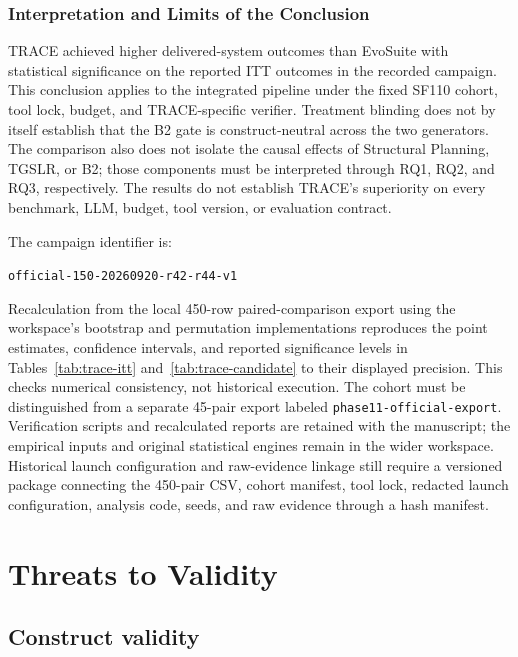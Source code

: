 \documentclass[pdflatex,sn-basic,Numbered,iicol]{sn-jnl}
\begin{document}
\subsubsection{Interpretation and Limits of the Conclusion}\label{subsubsec:trace-interpretation}

TRACE achieved higher delivered-system outcomes than EvoSuite with statistical significance on the reported ITT outcomes in the recorded campaign. This conclusion applies to the integrated pipeline under the fixed SF110 cohort, tool lock, budget, and TRACE-specific verifier. Treatment blinding does not by itself establish that the B2 gate is construct-neutral across the two generators. The comparison also does not isolate the causal effects of Structural Planning, TGSLR, or B2; those components must be interpreted through RQ1, RQ2, and RQ3, respectively. The results do not establish TRACE's superiority on every benchmark, LLM, budget, tool version, or evaluation contract.

The campaign identifier is:
\begin{center}
\small\nolinkurl{official-150-20260920-r42-r44-v1}
\end{center}
Recalculation from the local 450-row paired-comparison export using the workspace's bootstrap and permutation implementations reproduces the point estimates, confidence intervals, and reported significance levels in Tables~\ref{tab:trace-itt} and~\ref{tab:trace-candidate} to their displayed precision. This checks numerical consistency, not historical execution. The cohort must be distinguished from a separate 45-pair export labeled \texttt{phase11-official-export}. Verification scripts and recalculated reports are retained with the manuscript; the empirical inputs and original statistical engines remain in the wider workspace. Historical launch configuration and raw-evidence linkage still require a versioned package connecting the 450-pair CSV, cohort manifest, tool lock, redacted launch configuration, analysis code, seeds, and raw evidence through a hash manifest.

\section{Threats to Validity}\label{sec:threats}

\subsection{Construct validity}
\end{document}
